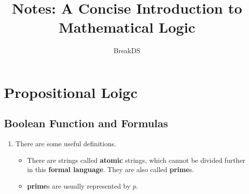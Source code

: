 \documentclass[a4paper, 12pt]{article}
\title{Notes: A Concise Introduction to Mathematical Logic}
\author{BreakDS}
\date{}
\begin{document}
\maketitle

\section{Propositional Loigc}
\subsection{Boolean Function and Formulas}
\begin{enumerate}
\item There are some useful definitions.
  \begin{itemize}
  \item There are strings called \textbf{atomic} strings, which cannot
    be divided further in this \textbf{formal language}. They are also
    called \textbf{prime}s.
  \item \textbf{prime}s are usually represented by $p$.
  \end{itemize}
\end{enumerate}
\subsection{}
\subsection{}
\end{document}
